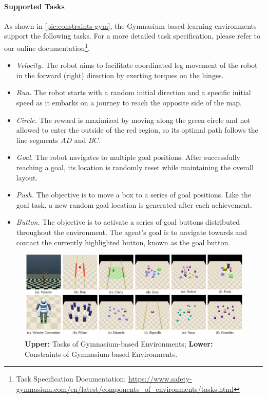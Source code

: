 \documentclass{article}
\begin{document}
\paragraph{Supported Tasks}
As shown in \autoref{pic:constraints-gym}, the Gymnasium-based learning environments support the following tasks. For a more detailed task specification, please refer to our online documentation\footnote{Task Specification Documentation: \url{https://www.safety-gymnasium.com/en/latest/components_of_environments/tasks.html}}. 
\begin{itemize}[left=0.3cm]
    \item \textit{Velocity.} The robot aims to facilitate coordinated leg movement of the robot in the forward (right) direction by exerting torques on the hinges.
    \item \textit{Run.} The robot starts with a random initial direction and a specific initial speed as it embarks on a journey to reach the opposite side of the map.
    \item \textit{Circle.} The reward is maximized by moving along the green circle and not allowed to enter the outside of the red region, so its optimal path follows the line segments $AD$ and $BC$. 
    \item \textit{Goal.} The robot navigates to multiple goal positions. After successfully reaching a goal, its location is randomly reset while maintaining the overall layout. 
    \item \textit{Push.} The objective is to move a box to a series of goal positions. Like the goal task, a new random goal location is generated after each achievement. 
    \item \textit{Button.} The objective is to activate a series of goal buttons distributed throughout the environment. The agent's goal is to navigate towards and contact the currently highlighted button, known as the goal button.
\end{itemize}

\begin{figure}[ht]
  \centering
  \includegraphics[width=\linewidth]{assets/main-paper/tasks_and_constraints.pdf}
  \caption{\textbf{Upper: }Tasks of Gymnasium-based Environments; \textbf{Lower: }Constraints of Gymnasium-based Environments.}
  \label{pic:constraints-gym}
\end{figure}
\end{document}
